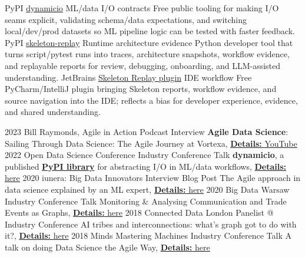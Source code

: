 \documentclass[]{../../friggeri-cv}
\begin{document}
\begin{entrylist2}
	\entrytwo
		{\small PyPI}
		{\small \href{https://pypi.org/project/dynamicio/}{dynamicio}}
		{\small ML/data I/O contracts}
		{\footnotesize Free public tooling for making I/O seams explicit, validating schema/data expectations, and switching local/dev/prod datasets so ML pipeline logic can be tested with faster feedback.}
	\entrytwo
		{\small PyPI}
		{\small \href{https://pypi.org/project/skeleton-replay/}{skeleton-replay}}
		{\small Runtime architecture evidence}
		{\footnotesize Python developer tool that turns script/pytest runs into traces, architecture snapshots, workflow evidence, and replayable reports for review, debugging, onboarding, and LLM-assisted understanding.}
	\entrytwo
		{\small JetBrains}
		{\small \href{https://plugins.jetbrains.com/plugin/32807-skeleton-replay}{Skeleton Replay plugin}}
		{\small IDE workflow}
		{\footnotesize Free PyCharm/IntelliJ plugin bringing Skeleton reports, workflow evidence, and source navigation into the IDE; reflects a bias for developer experience, evidence, and shared understanding.}
\end{entrylist2}
\begin{entrylist2}
	\entrytwo
		{\small 2023}
		{\small Bill Raymonds, Agile in Action}
		{\small Podcast Interview}
		{\small \textbf{Agile Data Science}: Sailing Through Data Science: The Agile Journey at Vortexa, \underline{\textbf{Details:} \href{https://christos-hadjinikolis.github.io//2023/10/31/Agile-In-Action.html}{YouTube}}}
	\entrytwo
		{\small 2022}
		{\small Open Data Science Conference}
		{\small Industry Conference Talk}
		{\small \textbf{dynamicio}, a published \href{https://pypi.org/project/dynamicio/}{\textbf{PyPI library}} for abstracting I/O in ML/data workflows, \underline{\textbf{Details:} \href{https://odsc.com/speakers/dynamicio-a-pandas-i-o-wrapper-why-you-should-start-your-ml-ops-journey-with-wrapping-your-i-o/}{here}}}
	\entrytwo
		{\small 2020}
		{\small iunera: Big Data Innovators}
		{\small Interview Blog Post}
		{\small The Agile approach in data science explained by an ML expert, \underline{\textbf{Details:} \href{https://www.iunera.com/kraken/interviews/the-agile-approach-in-data-science-explained-by-an-ml-expert/}{here}}}
	\entrytwo
		{\small 2020}
		{\small Big Data Warsaw}
		{\small Industry Conference Talk}
		{\small Monitoring \& Analysing Communication and Trade Events as Graphs, \underline{\textbf{Details:} \href{https://bigdatatechwarsaw.eu/agenda/}{here}}}
	\entrytwo
		{\small 2018}
		{\small Connected Data London}
		{\small Panelist @ Industry Conference}
		{\small AI tribes and interconnections: what’s graph got to do with it?, \underline{\textbf{Details:} \href{http://connected-data.london/2018/09/23/ai-tribes-and-interconnections-whats-graph-got-to-do-with-it/}{here}}}
	\entrytwo
		{\small 2018}
		{\small Minds Mastering Machines}
		{\small Industry Conference Talk}
		{\small A talk on doing Data Science the Agile Way, \underline{\textbf{Details:} \href{https://2018.mcubed.london/sessions/data-science-agile-way/}{here}}}
\end{entrylist2}
\end{document}
